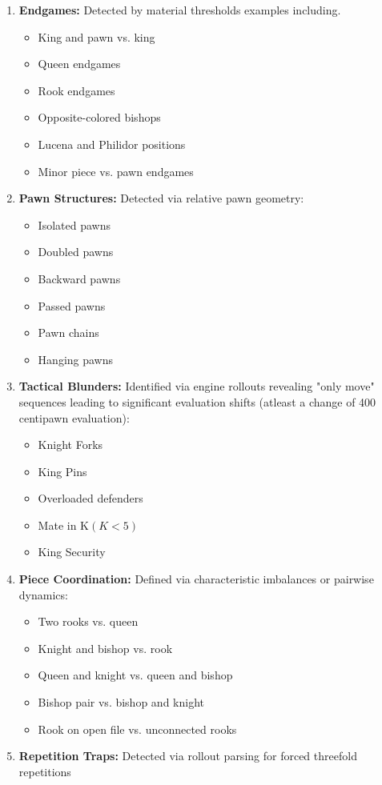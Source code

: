 \documentclass{article}
\theoremstyle{plain}
\theoremstyle{definition}
\theoremstyle{remark}
\begin{document}
\begin{enumerate}
    \item \textbf{Endgames:} Detected by material thresholds examples including.
    \begin{itemize}
        \item King and pawn vs. king
        \item Queen endgames
        \item Rook endgames
        \item Opposite-colored bishops
        \item Lucena and Philidor positions
        \item Minor piece vs. pawn endgames
    \end{itemize}
    
    \item \textbf{Pawn Structures:} Detected via relative pawn geometry:
    \begin{itemize}
        \item Isolated pawns
        \item Doubled pawns
        \item Backward pawns
        \item Passed pawns
        \item Pawn chains
        \item Hanging pawns
    \end{itemize}
    
    \item \textbf{Tactical Blunders:} Identified via engine rollouts revealing "only move" sequences leading to significant evaluation shifts (atleast a change of 400 centipawn evaluation):
    \begin{itemize}
        \item Knight Forks
        \item King Pins
        \item Overloaded defenders
        \item Mate in K$(K<5)$
        \item King Security
    \end{itemize}
    
    \item \textbf{Piece Coordination:} Defined via characteristic imbalances or pairwise dynamics:
    \begin{itemize}
        \item Two rooks vs. queen
        \item Knight and bishop vs. rook
        \item Queen and knight vs. queen and bishop
        \item Bishop pair vs. bishop and knight
        \item Rook on open file vs. unconnected rooks
    \end{itemize}
    
    \item \textbf{Repetition Traps:} Detected via rollout parsing for forced threefold repetitions
\end{enumerate}
\end{document}
